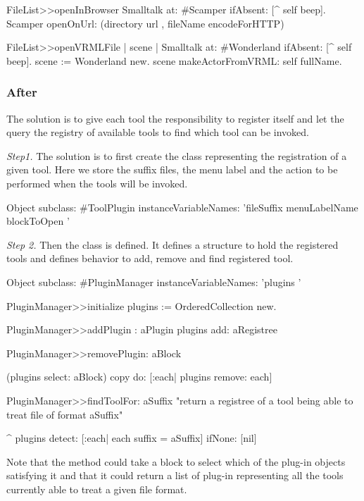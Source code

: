 \documentclass[a4paper,10pt,twoside]{book}
\begin{document}
\begin{code}
FileList>>openInBrowser
	Smalltalk at: #Scamper ifAbsent: [^ self beep].
	Scamper openOnUrl: (directory url , fileName encodeForHTTP)

FileList>>openVRMLFile
	| scene |
	Smalltalk at: #Wonderland ifAbsent: [^ self beep].
	scene := Wonderland new.
	scene makeActorFromVRML: self fullName.
\end{code}

\subsubsection*{After}

The solution is to give each tool the responsibility to register itself and let the  query the registry of available tools to find which tool can be invoked.

\noindent
\emph{Step1.}
The solution is to first create the class  representing the registration of a given tool. Here we store the suffix files, the menu label and the action to be performed when the tools will be invoked. 

\begin{code}
Object subclass: #ToolPlugin
	instanceVariableNames: 'fileSuffix menuLabelName blockToOpen '
\end{code}

\noindent
\emph{Step 2.}
Then the class  is defined. It defines a structure to hold the registered tools and defines behavior to add, remove and find registered tool.

\begin{code}
Object subclass: #PluginManager
	instanceVariableNames: 'plugins '

PluginManager>>initialize
	plugins := OrderedCollection new.

PluginManager>>addPlugin : aPlugin
	plugins add: aRegistree

PluginManager>>removePlugin: aBlock

	(plugins select: aBlock) copy 
		do: [:each| plugins remove: each]

PluginManager>>findToolFor: aSuffix
	"return a registree of a tool being able to treat file of format 
	aSuffix"

	^ plugins 
			detect: [:each| each suffix = aSuffix]
			ifNone: [nil]
\end{code}

Note that the  method could take a block to select which of the plug-in objects satisfying it and that it could return a list of plug-in representing all the tools currently able to treat a given file format. 
\end{document}
